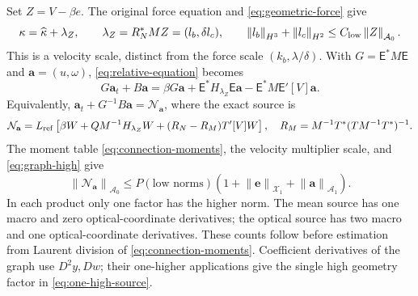\documentclass[11pt,a4paper]{article}
\numberwithin{equation}{section}
\theoremstyle{remark}
\newcommand{\norm}[1]{\left\lVert #1\right\rVert}
\newcommand{\Graph}{\mathsf E}
\newcommand{\Xone}{\mathcal X_1}
\newcommand{\Azero}{\mathcal A_0}
\newcommand{\Aone}{\mathcal A_1}
\begin{document}
Set \(Z=V-\beta e\). The original force equation and
\eqref{eq:geometric-force} give
\[
 \kappa=\widehat\kappa+\lambda_Z,\qquad
 \lambda_Z=R_N^*MZ=(l_b,\delta l_c),\qquad
 \norm{l_b}_{H^3}+\norm{l_c}_{H^2}
                    \leq C_{\rm low}\norm Z_{\Azero}.
\]
This is a velocity scale, distinct from the force scale
\((k_b,\lambda/\delta)\).
With \(G=\Graph^*M\Graph\) and \(\mathbf a=(u,\omega)\),
\eqref{eq:relative-equation} becomes
\[
 G\mathbf a_t+B\mathbf a
  =\beta G\mathbf a+\Graph^*H_{\lambda_Z}\Graph\mathbf a
                         -\Graph^*M\Graph'[V]\mathbf a .
\]
Equivalently, \(\mathbf a_t+G^{-1}B\mathbf a=\mathcal N_{\mathbf a}\),
where the exact source is
\begin{equation}\label{eq:physical-source}
 \mathcal N_{\mathbf a}
  =L_{\rm ref}\left[\beta W+QM^{-1}H_{\lambda_Z}W
                         +(R_N-R_M)T'[V]W\right],
 \quad R_M=M^{-1}T^*(TM^{-1}T^*)^{-1}.
\end{equation}
The moment table \eqref{eq:connection-moments}, the velocity multiplier
scale, and \eqref{eq:graph-high} give
\begin{equation}\label{eq:one-high-source}
 \norm{\mathcal N_{\mathbf a}}_{\Azero}
 \leq P(\text{low norms})
       \left(1+\norm{\mathbf e}_{\Xone}
                          +\norm{\mathbf a}_{\Aone}\right).
\end{equation}
In each product only one factor has the higher norm. The mean source
has one macro and zero optical-coordinate derivatives; the optical
source has two macro and one optical-coordinate derivatives.
These counts follow before estimation from Laurent division of
\eqref{eq:connection-moments}. Coefficient derivatives of the graph
use \(D^2y,Dw\); their one-higher applications give the single high
geometry factor in \eqref{eq:one-high-source}.
\end{document}
